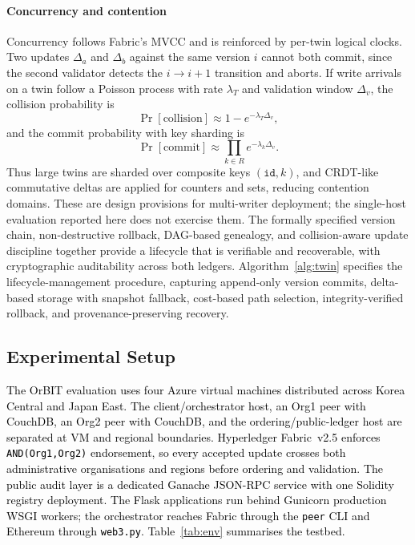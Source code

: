 \documentclass[final,5p,times,twocolumn]{elsarticle}
\begin{document}
\paragraph*{\textbf{Concurrency and contention}}
Concurrency follows Fabric's MVCC and is reinforced by per-twin logical clocks. Two updates $\Delta_a$ and $\Delta_b$ against the same version $i$ cannot both commit, since the second validator detects the $i\!\to\!i{+}1$ transition and aborts. If write arrivals on a twin follow a Poisson process with rate $\lambda_T$ and validation window $\Delta_v$, the collision probability is
\begin{equation}
  \Pr[\mathrm{collision}] \approx 1 - e^{-\lambda_T\Delta_v},
  \label{eq:collision}
\end{equation}
and the commit probability with key sharding is
\begin{equation}
  \Pr[\mathrm{commit}] \approx \prod_{k\in R} e^{-\lambda_k\Delta_v}.
  \label{eq:commit_prob_dt}
\end{equation}
Thus large twins are sharded over composite keys $(\texttt{id},k)$, and CRDT-like commutative deltas are applied for counters and sets, reducing contention domains. These are design provisions for multi-writer deployment; the single-host evaluation reported here does not exercise them. The formally specified version chain, non-destructive rollback, DAG-based genealogy, and collision-aware update discipline together provide a lifecycle that is verifiable and recoverable, with cryptographic auditability across both ledgers. Algorithm~\ref{alg:twin} specifies the lifecycle-management procedure, capturing append-only version commits, delta-based storage with snapshot fallback, cost-based path selection, integrity-verified rollback, and provenance-preserving recovery.

\subsection{\textbf{Experimental Setup}}
\label{sec:exp_setup}
\textcolor{black}{The OrBIT evaluation uses four Azure virtual machines distributed across Korea Central and Japan East. The client/orchestrator host, an Org1 peer with CouchDB, an Org2 peer with CouchDB, and the ordering/public-ledger host are separated at VM and regional boundaries. Hyperledger Fabric~v2.5 enforces \texttt{AND(Org1,Org2)} endorsement, so every accepted update crosses both administrative organisations and regions before ordering and validation. The public audit layer is a dedicated Ganache JSON-RPC service with one Solidity registry deployment. The Flask applications run behind Gunicorn production WSGI workers; the orchestrator reaches Fabric through the \texttt{peer} CLI and Ethereum through \texttt{web3.py}. Table~\ref{tab:env} summarises the testbed.}
\end{document}
